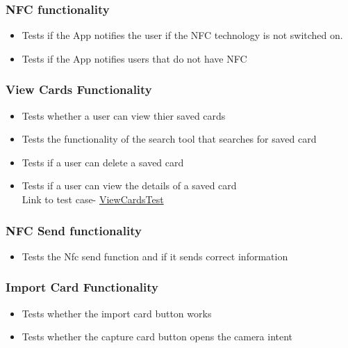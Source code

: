\documentclass[english]{article}
\begin{document}
		\subsubsection{NFC functionality}
		\begin{itemize} 
			\item Tests if the App notifies the user if the NFC technology is not switched on.
			\item Tests if the App notifies users that do not have NFC
\\
					\href{url}{}
			
		\end{itemize}
		\subsubsection{View Cards Functionality}
		\begin{itemize}
			\item Tests whether a user can view thier saved cards
			\item Tests the functionality of the search tool that searches for saved card
			\item Tests if a user can delete a saved card
			\item Tests if a user can view the details of a saved card
\\Link to test case-
					\href{https://github.com/XoloKDandashe/Alpha-Tech/blob/master/Code/NFCBusinessCardLocal2/app/src/androidTest/java/com/example/www/nfcbusinesscardlocal/ViewCardsTest.java}{ViewCardsTest}
		\end{itemize}
		\subsubsection{NFC Send functionality}
		\begin{itemize} 
			\item Tests the Nfc send function and if it sends correct information
\\
					\href{url}{}
		\end{itemize}

		\subsubsection{Import Card Functionality}
		\begin{itemize}
			\item Tests whether the import card button works
			\item Tests whether the capture card button opens the camera intent
		\\
					\href{url}{}
		\end{itemize}
\end{document}
